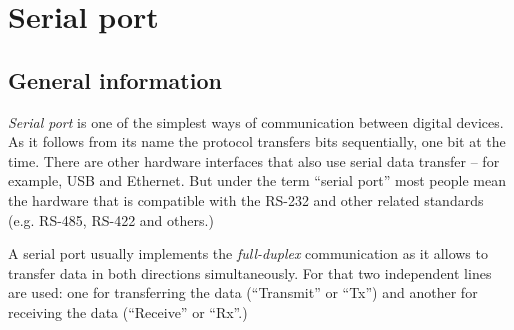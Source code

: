 \documentclass[../sparc.tex]{subfiles}
\begin{document}
\section{Serial port}
\label{section:communication-serial-port}

\subsection{General information}

\emph{Serial port} is one of the simplest ways of communication between digital
devices.  As it follows from its name the protocol transfers bits sequentially,
one bit at the time.  There are other hardware interfaces that also use serial
data transfer -- for example, USB and Ethernet.  But under the term ``serial
port'' most people mean the hardware that is compatible with the RS-232 and
other related standards (e.g. RS-485, RS-422 and others.)

A serial port usually implements the \emph{full-duplex} communication as it
allows to transfer data in both directions simultaneously.  For that two
independent lines are used: one for transferring the data (``Transmit'' or
``Tx'') and another for receiving the data (``Receive'' or ``Rx''.)
\end{document}

